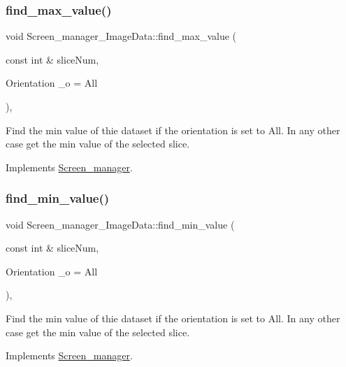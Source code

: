 \subsubsection{\texorpdfstring{find\+\_\+max\+\_\+value()}{find\_max\_value()}}
{\footnotesize\ttfamily void Screen\+\_\+manager\+\_\+\+Image\+Data\+::find\+\_\+max\+\_\+value (\begin{DoxyParamCaption}\item[{const int \&}]{slice\+Num,  }\item[{Orientation}]{\+\_\+o = {\ttfamily All} }\end{DoxyParamCaption})\hspace{0.3cm}{\ttfamily [protected]}, {\ttfamily [virtual]}}

Find the min value of thie dataset if the orientation is set to All. In any other case get the min value of the selected slice. 

Implements \mbox{\hyperlink{classScreen__manager}{Screen\+\_\+manager}}.

\mbox{\label{classScreen__manager__ImageData_acd1f4db9d2d469e2e51972a6b0ad7d27}} 
\subsubsection{\texorpdfstring{find\+\_\+min\+\_\+value()}{find\_min\_value()}}
{\footnotesize\ttfamily void Screen\+\_\+manager\+\_\+\+Image\+Data\+::find\+\_\+min\+\_\+value (\begin{DoxyParamCaption}\item[{const int \&}]{slice\+Num,  }\item[{Orientation}]{\+\_\+o = {\ttfamily All} }\end{DoxyParamCaption})\hspace{0.3cm}{\ttfamily [protected]}, {\ttfamily [virtual]}}

Find the min value of thie dataset if the orientation is set to All. In any other case get the min value of the selected slice. 

Implements \mbox{\hyperlink{classScreen__manager}{Screen\+\_\+manager}}.

\mbox{\label{classScreen__manager_a86a2c051954195c03f8718f4e371c221}} 
